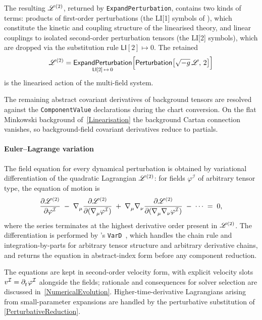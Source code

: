 The resulting $\mathscr{L}^{(2)}$, returned by \texttt{ExpandPerturbation},
contains two kinds of terms: products of first-order perturbations
(the \textsf{LI}[1] symbols of \xPert{}), which constitute the kinetic
and coupling structure of the linearised theory, and linear couplings
to isolated second-order perturbation tensors
(the \textsf{LI}[2] symbols), which are dropped via the
substitution rule $\textsf{LI}[2] \mapsto 0$.
The retained
\begin{equation*}
  \mathscr{L}^{(2)}
  =
  \underset{\textsf{LI}[2]\,\mapsto\,0}{\textsf{ExpandPerturbation}} \Bigl[
    \textsf{Perturbation} \bigl[\sqrt{-g}\,\mathscr{L},\,2 \bigr]
  \Bigr]
\end{equation*}
is the linearised action of the multi-field system.

The remaining abstract covariant derivatives of background tensors are
resolved against the \texttt{ComponentValue} declarations during the
chart conversion.
On the flat Minkowski background of~\cref{Linearisation} the background
Cartan connection vanishes, so background-field covariant derivatives
reduce to partials.

\paragraph*{Euler--Lagrange variation}
The field equation for every dynamical perturbation is obtained by
variational differentiation of the quadratic Lagrangian $\mathscr{L}^{(2)}$:
for fields $\varphi^{\mathcal{I}}$
of arbitrary tensor type, the equation of motion is
\begin{equation*}
  \frac{\partial \lag^{(2)}}{\partial \varphi^{\mathcal{I}}}
  \;-\; \rcD{_\mu} \frac{\partial \lag^{(2)}}{\partial(\rcD{_\mu}\varphi^{\mathcal{I}})}
  \;+\; \rcD{_\mu}\rcD{_\nu} \frac{\partial \lag^{(2)}}{\partial(\rcD{_\mu}\rcD{_\nu}\varphi^{\mathcal{I}})}
  \;-\; \cdots \;=\; 0,
\end{equation*}
where the series terminates at the highest derivative order present in
$\mathscr{L}^{(2)}$.
The differentiation is performed by \xAct{}'s
\texttt{VarD}~\cite{martingarcia2007xact}, which handles the chain rule
and integration-by-parts for arbitrary tensor structure and arbitrary
derivative chains, and returns the equation in abstract-index form
before any component reduction.

The equations are kept in second-order velocity form, with explicit
velocity slots $v^{\mathcal{I}} = \PD{_t}\varphi^{\mathcal{I}}$
alongside the fields; rationale and consequences for solver selection
are discussed in~\cref{NumericalEvolution}.
Higher-time-derivative Lagrangians arising from small-parameter
expansions are handled by the perturbative substitution of
\cref{PerturbativeReduction}.

